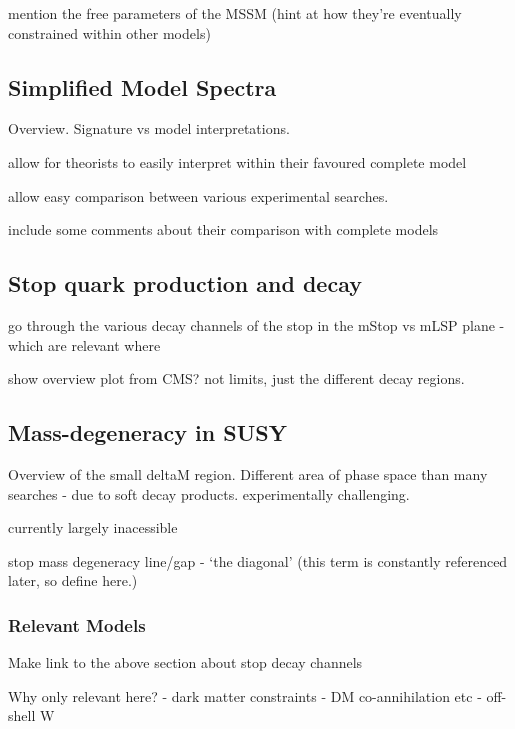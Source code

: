 mention the free parameters of the MSSM (hint at how they're eventually 
constrained within other models)


\subsection{Simplified Model Spectra}
Overview. Signature vs model interpretations.

allow for theorists to easily interpret within their favoured complete model

allow easy comparison between various experimental searches.

include some comments about their comparison with complete models


\subsection{Stop quark production and decay}
go through the various decay channels of the stop in the mStop vs mLSP plane
- which are relevant where

show overview plot from CMS? not limits, just the different decay regions.

\subsection{Mass-degeneracy in SUSY}
Overview of the small deltaM region. Different area of phase space than many
searches - due to soft decay products. experimentally challenging.

currently largely inacessible

stop mass degeneracy line/gap - `the diagonal' (this term is constantly
referenced later, so define here.)

\subsubsection{Relevant Models}
Make link to the above section about stop decay channels

Why only relevant here?
- dark matter constraints - DM co-annihilation etc
- off-shell W

